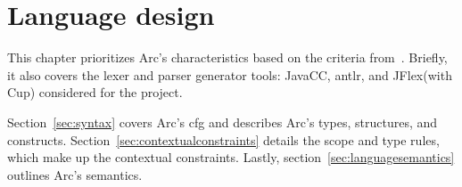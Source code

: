 \chapter{Language design}\label{cha:languagedesign}
This chapter prioritizes Arc's characteristics based on the criteria from~\cite{Sebesta2016}. Briefly, it also covers the lexer and parser generator tools: JavaCC, \gls{antlr}, and JFlex(with Cup) considered for the project.

Section~\ref{sec:syntax} covers Arc's \gls{cfg} and describes Arc's types, structures, and constructs. Section~\ref{sec:contextualconstraints} details the scope and type rules, which make up the contextual constraints. Lastly, section~\ref{sec:languagesemantics} outlines Arc's semantics.







